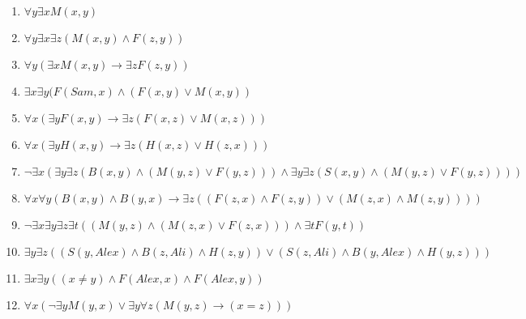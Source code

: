 \documentclass[a4paper,12pt]{article}
\begin{document}
\begin{tcolorbox}
 \begin{multicols}{2}

    \begin{enumerate}[label=\textbf{\arabic*})]
    
    \item $ \forall y \exists x M(x,y)$
    \item $ \forall y \exists x \exists z (M(x,y) \land F(z,y)) $
    \item $ \forall y (\exists x M(x,y) \rightarrow \exists z F(z,y)) $
    \item $ \exists x \exists y (F(Sam,x) \land (F(x,y) \lor M(x,y)) $
    \item $ \forall x (\exists y F(x,y) \rightarrow \exists z(F(x,z) \lor M(x,z)))$
    \item $ \forall x (\exists y H(x,y) \rightarrow \exists z (H(x,z) \lor H(z,x)))$
    \item $\neg \exists x (\exists y \exists z(B(x,y) \land (M(y,z) \lor F(y,z))) \land \exists y \exists z (S(x,y) \land (M(y,z) \lor F(y,z)))) $
    \item $ \forall x \forall y (B(x,y) \land B(y,x) \rightarrow \exists z((F(z,x)\land F(z,y)) \lor (M(z,x)\land M(z,y)))) $
    \item $\neg \exists x \exists y \exists z \exists t ((M(y,z)\land(M(z,x)\lor F(z,x))) \land \exists t F(y,t)) $
    \item $ \exists y \exists z ((S(y,Alex) \land B(z,Ali) \land H(z,y)) \lor (S(z,Ali) \land B(y,Alex) \land H(y,z))) $
    \item $ \exists x \exists y ((x\neq y) \land F(Alex,x) \land F(Alex,y)) $
    \item $ \forall x (\neg\exists y M(y,x) \lor \exists y \forall z (M(y,z) \rightarrow (x = z))) $
    \end{enumerate}

    \end{multicols}

\end{tcolorbox}


\newpage
\end{document}
